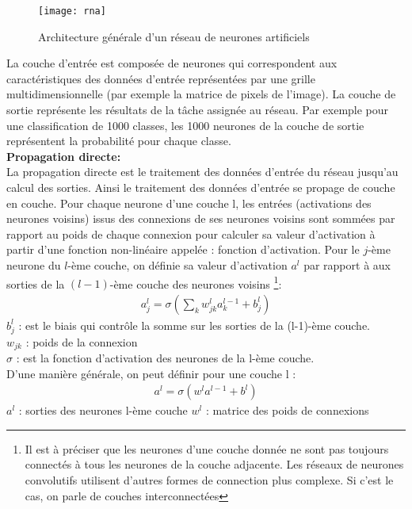 \begin{figure}[h]
	\begin{center}
		\texttt{[image: rna]}
		\caption{Architecture générale d'un réseau de neurones artificiels}
	\end{center}
\end{figure}
\smallskip

La couche d'entrée est composée de neurones qui correspondent aux caractéristiques des données d'entrée représentées par une grille multidimensionnelle (par exemple la matrice de pixels de l'image). La couche de sortie représente les résultats de la tâche assignée au réseau. Par exemple pour une classification de 1000 classes, les 1000 neurones de la couche de sortie représentent la probabilité pour chaque classe.\\
\smallskip
\textbf{Propagation directe:}\\
La propagation directe est le traitement des données d'entrée du réseau jusqu'au calcul des sorties. Ainsi le traitement des données d'entrée se propage de couche en couche. Pour chaque neurone d'une couche l, les entrées (activations des neurones voisins) issus des connexions de ses neurones voisins sont sommées par rapport au poids de chaque connexion pour calculer sa valeur d'activation à partir d'une fonction non-linéaire appelée : fonction d'activation.
Pour le $j$-ème neurone du $l$-ème couche, on définie sa valeur d'activation $a^l$ par rapport à aux sorties de la $(l-1)$-ème couche des neurones voisins \footnote{Il est à préciser que les neurones d'une couche donnée ne sont pas toujours connectés à tous les neurones de la couche adjacente. Les réseaux de neurones convolutifs utilisent d'autres formes de connection plus complexe. Si c'est le cas, on parle de couches interconnectées}:
\begin{eqnarray} a^{l}_j = \sigma\left( \sum_k w^{l}_{jk} a^{l-1}_k + b^l_j \right)\end{eqnarray}
$ b^l_j$ : est le biais qui contrôle la somme sur les sorties de la (l-1)-ème couche.\\
$w_{jk}$ : poids de la connexion\\
$\sigma$ : est la fonction d'activation des neurones de la l-ème couche.\\
D'une manière générale, on peut définir pour une couche l :
\begin{eqnarray} a^{l} = \sigma(w^l a^{l-1}+b^l)\end{eqnarray}
$a^l$ : sorties des neurones l-ème couche
$w^l$ : matrice des poids de connexions

